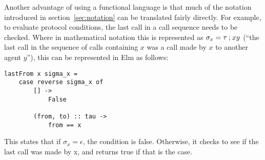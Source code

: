 Another advantage of using a functional language is that much of the notation introduced in section~\ref{sec:notation} can be translated fairly directly.
For example, to evaluate protocol conditions, the last call in a call sequence needs to be checked.
Where in mathematical notation this is represented as \(\sigma_x = \tau \mathbin{;} xy\) (``the last call in the sequence of calls containing \(x\) was a call made by \(x\) to another agent \(y\)''), this can be represented in Elm as follows:

\begin{lstlisting}[caption={\(\sigma_x = \tau \conc xy\) in Elm}, label=lst:elm-ex-1]
lastFrom x sigma_x = 
    case reverse sigma_x of
        [] ->
            False
        
        (from, to) :: tau ->
            from == x
\end{lstlisting}

This states that if \(\sigma_x = \epsilon\), the condition is false. 
Otherwise, it checks to see if the last call was made by x, and returns true if that is the case.


